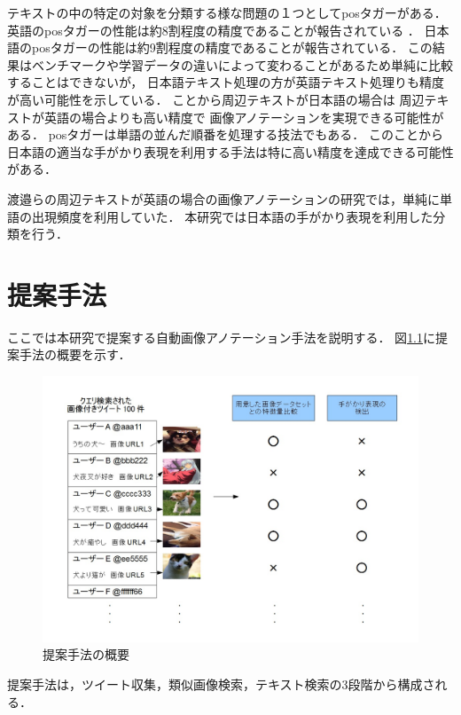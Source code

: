テキストの中の特定の対象を分類する様な問題の１つとしてposタガーがある．
英語のposタガーの性能は約8割程度の精度であることが報告されている
\cite{BirdKleinLoper09}
．
日本語のposタガーの性能は約9割程度の精度であることが報告されている\cite{UniDicJp2010}．
この結果はベンチマークや学習データの違いによって変わることがあるため単純に比較することはできないが，
日本語テキスト処理の方が英語テキスト処理りも精度が高い可能性を示している．
ことから周辺テキストが日本語の場合は
周辺テキストが英語の場合よりも高い精度で
画像アノテーションを実現できる可能性がある．
posタガーは単語の並んだ順番を処理する技法でもある．
このことから日本語の適当な手がかり表現を利用する手法は特に高い精度を達成できる可能性がある．

渡邉ら\cite{watanabe}の周辺テキストが英語の場合の画像アノテーションの研究では，単純に単語の出現頻度を利用していた．
本研究では日本語の手がかり表現を利用した分類を行う．




\chapter{提案手法}
\label{sec:way}

ここでは本研究で提案する自動画像アノテーション手法を説明する．
図\ref{fig:way}に提案手法の概要を示す．
%
\begin{figure}[tb]
 \begin{center}
  \includegraphics[scale=0.50]{way.jpg}
 \end{center}
 \caption{提案手法の概要}
 \label{fig:way}
\end{figure}
%
提案手法は，ツイート収集，類似画像検索，テキスト検索の3段階から構成される．


